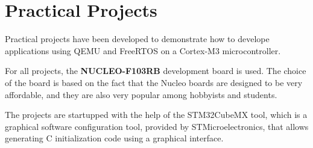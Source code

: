 \section{Practical Projects}
Practical projects have been developed to demonstrate how to develope applications using QEMU and FreeRTOS on a Cortex-M3 microcontroller.

For all projects, the \textbf{NUCLEO-F103RB} development board is used. The choice of the board is based on the fact that the Nucleo boards are designed to be very affordable, and they are also very popular among hobbyists and students.

The projects are startupped with the help of the STM32CubeMX tool, which is a graphical software configuration tool, provided by STMicroelectronics, that allows generating C initialization code using a graphical interface.





